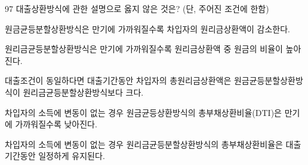 \begin{question}{97}
대출상환방식에 관한 설명으로 옳지 않은 것은? (단, 주어진 조건에 한함)
\begin{choices}
  \item 원금균등분할상환방식은 만기에 가까워질수록 차입자의 원리금상환액이 감소한다.
  \item 원리금균등분할상환방식은 만기에 가까워질수록 원리금상환액 중 원금의 비율이 높아진다.
  \item 대출조건이 동일하다면 대출기간동안 차입자의 총원리금상환액은 원금균등분할상환방식이 원리금균등분할상환방식보다 크다.
  \item 차입자의 소득에 변동이 없는 경우 원금균등상환방식의 총부채상환비율(DTI)은 만기에 가까워질수록 낮아진다.
  \item 차입자의 소득에 변동이 없는 경우 원리금균등분할상환방식의 총부채상환비율은 대출기간동안 일정하게 유지된다.
\end{choices}
\end{question}
